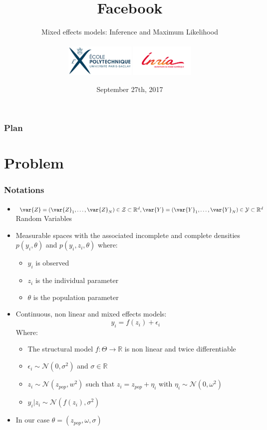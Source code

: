 \documentclass[xcolor={dvipsnames}]{beamer}
\title{Facebook}
\subtitle{Mixed effects models: Inference and Maximum Likelihood\\~\\
\includegraphics[height=1.5cm]{logo_x}
\includegraphics[height=1.5cm]{logo_inria}}
\institute{CMAP, Ecole Polytechnique}
\date{September 27th, 2017}
\begin{document}
\begin{frame}
\titlepage
\end{frame}

\begin{frame}
\frametitle{Plan}
\tableofcontents
\end{frame}




\section{Problem}

\begin{frame}
\frametitle{Notations}

\begin{itemize}
\item $\var{Z} = (\var{Z}_1,\dots,\var{Z}_N) \in \mathcal{Z} \subset \mathbb{R}^d, \var{Y} = (\var{Y}_1,\dots,\var{Y}_N) \in \mathcal{Y} \subset \mathbb{R}^d$ Random Variables
\item Measurable spaces with the associated incomplete and complete densities $p(y_i,\theta)$ and $p(y_i,z_i,\theta)$ where:
\begin{itemize}
  \item $y_i$ is observed
  \item $z_i$ is the individual parameter
  \item $\theta$ is the population parameter
\end{itemize}
\item Continuous, non linear and mixed effects models:
\begin{equation}
y_{i} = f(z_{i}) + \epsilon_i
\end{equation}
Where:
\begin{itemize}
  \item The structural model $f: \Theta \to \mathbb{R}$ is non linear and twice differentiable
  \item $\epsilon_i \sim \mathcal{N}(0,\sigma^2)$ and $\sigma \in \mathbb{R}$
  \item $z_i \sim \mathcal{N}(z_{pop},w^2)$ such that $z_i = z_{pop} + \eta_i$ with $\eta_i \sim \mathcal{N}(0,\omega^2)$
  \item $y_i | z_i \sim \mathcal{N}(f(z_i),\sigma^2)$
\end{itemize}
\item In our case $\theta = (z_{pop}, \omega, \sigma )$

\end{itemize}

\end{frame}
\end{document}
